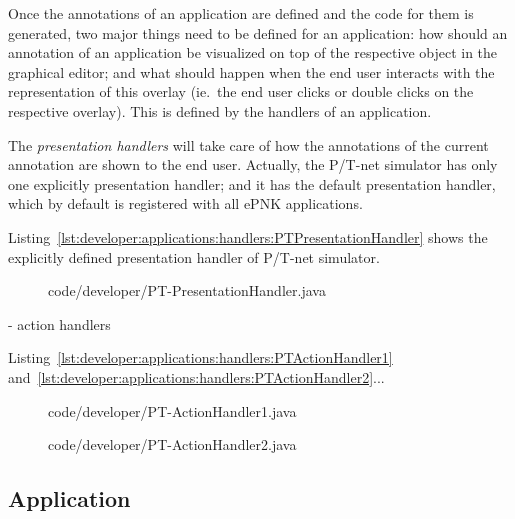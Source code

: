 Once the annotations of an application are defined and the code
for them is generated, two major things need to be defined for an application:
how should an annotation of an application be visualized on top of
the respective object in the graphical editor; and what should happen
when the end user interacts with the representation of this overlay (ie.\,
the end user clicks or double clicks on the respective overlay). This
is defined by the handlers of an application.

The \emph{presentation handlers} will take care of how the annotations of
the current annotation are shown to the end user. Actually, the
P/T-net simulator has only one explicitly presentation handler; and it has
the default presentation handler, which by default is registered with
all ePNK applications.

Listing~\ref{lst:developer:applications:handlers:PTPresentationHandler} shows the
explicitly defined presentation handler of P/T-net simulator.


\begin{figure}[htbp!]
%
  {code/developer/PT-PresentationHandler.java}
\end{figure}


- action handlers

Listing~\ref{lst:developer:applications:handlers:PTActionHandler1}
and~\ref{lst:developer:applications:handlers:PTActionHandler2}...

\begin{figure}[htbp!]
%
  {code/developer/PT-ActionHandler1.java}
\end{figure}

\begin{figure}[htbp!]
%
  {code/developer/PT-ActionHandler2.java}
\end{figure}



\subsection{Application}
\label{subsec:developer:applications:application}

